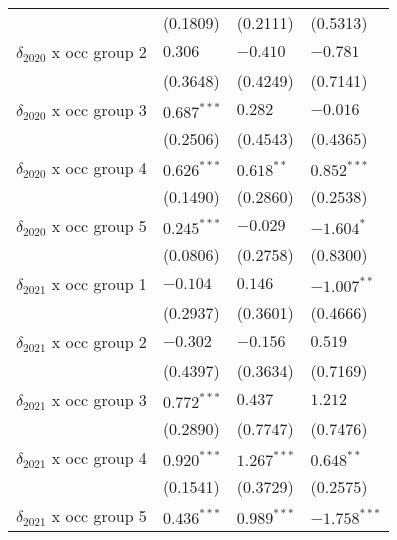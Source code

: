 \begin{tabular}{llll}
                                       &           (0.1809) &           (0.2111) &           (0.5313) \\
$\delta_{2020}$ x occ group 2          &            $0.306$ &           $-0.410$ &           $-0.781$ \\
                                       &           (0.3648) &           (0.4249) &           (0.7141) \\
$\delta_{2020}$ x occ group 3          &      $0.687^{***}$ &            $0.282$ &           $-0.016$ \\
                                       &           (0.2506) &           (0.4543) &           (0.4365) \\
$\delta_{2020}$ x occ group 4          &      $0.626^{***}$ &       $0.618^{**}$ &      $0.852^{***}$ \\
                                       &           (0.1490) &           (0.2860) &           (0.2538) \\
$\delta_{2020}$ x occ group 5          &      $0.245^{***}$ &           $-0.029$ &         $-1.604^*$ \\
                                       &           (0.0806) &           (0.2758) &           (0.8300) \\
$\delta_{2021}$ x occ group 1          &           $-0.104$ &            $0.146$ &      $-1.007^{**}$ \\
                                       &           (0.2937) &           (0.3601) &           (0.4666) \\
$\delta_{2021}$ x occ group 2          &           $-0.302$ &           $-0.156$ &            $0.519$ \\
                                       &           (0.4397) &           (0.3634) &           (0.7169) \\
$\delta_{2021}$ x occ group 3          &      $0.772^{***}$ &            $0.437$ &            $1.212$ \\
                                       &           (0.2890) &           (0.7747) &           (0.7476) \\
$\delta_{2021}$ x occ group 4          &      $0.920^{***}$ &      $1.267^{***}$ &       $0.648^{**}$ \\
                                       &           (0.1541) &           (0.3729) &           (0.2575) \\
$\delta_{2021}$ x occ group 5          &      $0.436^{***}$ &      $0.989^{***}$ &     $-1.758^{***}$ \\

\end{tabular}
